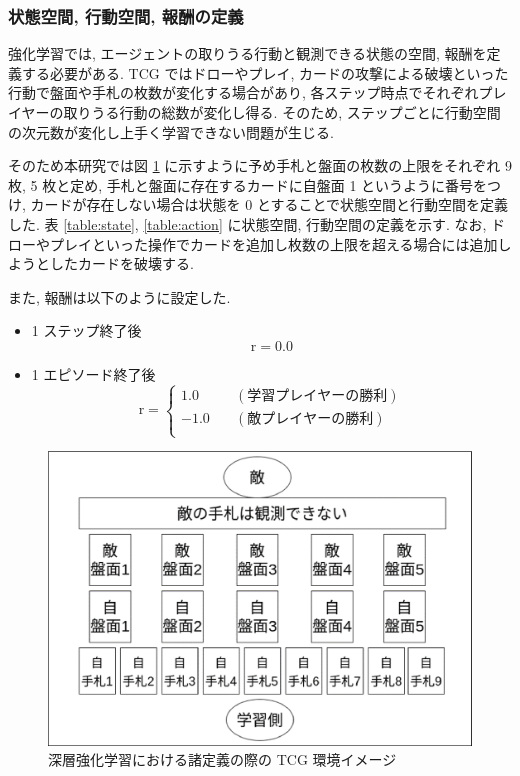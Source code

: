 \documentclass[12pt]{jarticle}
\begin{document}
\subsubsection{状態空間, 行動空間, 報酬の定義}
強化学習では, エージェントの取りうる行動と観測できる状態の空間, 報酬を定義する必要がある. 
TCG ではドローやプレイ, カードの攻撃による破壊といった行動で盤面や手札の枚数が変化する場合があり, 各ステップ時点でそれぞれプレイヤーの取りうる行動の総数が変化し得る. そのため, ステップごとに行動空間の次元数が変化し上手く学習できない問題が生じる. \par
そのため本研究では図 \ref{fig:CardGameImage} に示すように予め手札と盤面の枚数の上限をそれぞれ 9 枚, 5 枚と定め, 手札と盤面に存在するカードに自盤面 1 というように番号をつけ, カードが存在しない場合は状態を 0 とすることで状態空間と行動空間を定義した. 表 \ref{table:state}, \ref{table:action} に状態空間, 行動空間の定義を示す.
なお, ドローやプレイといった操作でカードを追加し枚数の上限を超える場合には追加しようとしたカードを破壊する.
\par
また, 報酬は以下のように設定した.\par
\begin{itemize}
  \vspace{-0.3cm}
  \item 1 ステップ終了後 
  \begin{equation*}
   \mathrm{r} = 0.0  
  \end{equation*}
  \item 1 エピソード終了後
  \begin{equation*}
    \mathrm{r} = 
    \left\{
      \begin{aligned}
          1.0 \quad & (\mathrm{学習プレイヤーの勝利}) \\
          -1.0 \quad & (\mathrm{敵プレイヤーの勝利}) \\
      \end{aligned}
    \right.
  \end{equation*} 
\end{itemize}

\vspace{-0.3cm}
\begin{figure}[t]
  \centering
  \includegraphics[width=150mm]{assets/cardgameimage.eps}
  \vspace{-0.3cm}
  \caption{深層強化学習における諸定義の際の TCG 環境イメージ}
  \label{fig:CardGameImage}
\end{figure}
\end{document}
